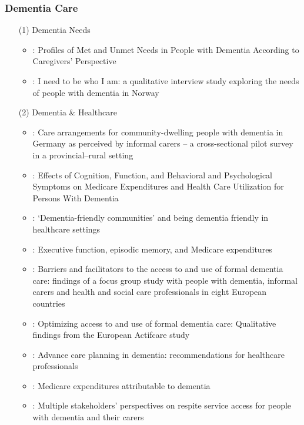 \documentclass[12pt]{article}
\begin{document}
\subsubsection{Dementia Care}
\begin{itemize}
    \item[(1)] Dementia Needs
    \begin{itemize}
        \item \cite{janssen2020profiles}: Profiles of Met and Unmet Needs in People with Dementia According to Caregivers' Perspective
        \item \cite{telenius2020need}: I need to be who I am: a qualitative interview study exploring the needs of people with dementia in Norway
    \end{itemize}
    \item[(2)] Dementia \& Healthcare
    \begin{itemize}
        \item \cite{von2016care}: Care arrangements for community-dwelling people with dementia in Germany as perceived by informal carers – a cross-sectional pilot survey in a provincial–rural setting
        \item \cite{jutkowitz2017effects}: Effects of Cognition, Function, and Behavioral and Psychological Symptoms on Medicare Expenditures and Health Care Utilization for Persons With Dementia
        \item \cite{lin2017dementia}: ‘Dementia-friendly communities’ and being dementia friendly in healthcare settings
        \item \cite{bender2017executive}: Executive function, episodic memory, and Medicare expenditures
        \item \cite{stephan2018barriers}: Barriers and facilitators to the access to and use of formal dementia care: findings of a focus group study with people with dementia, informal carers and health and social care professionals in eight European countries
        \item \cite{kerpershoek2019optimizing}: Optimizing access to and use of formal dementia care: Qualitative findings from the European Actifcare study
        \item \cite{harrison2019advance}: Advance care planning in dementia: recommendations for healthcare professionals
        \item \cite{white2019medicare}: Medicare expenditures attributable to dementia
        \item \cite{o2019multiple}: Multiple stakeholders' perspectives on respite service access for people with dementia and their carers

\end{itemize}
\end{itemize}
\end{document}
